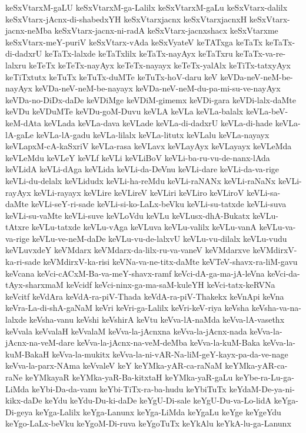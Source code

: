 {keSxVtarxM-gaLU
keSxVtarxM-ga-Lalilx
keSxVtarxM-gaLu
keSxVtarx-dalilx
keSxVtarx-jAcnx-di-shabedxYH
keSxVtarxjacnx
keSxVtarxjacnxH
keSxVtarx-jacnx-neMba
keSxVtarx-jacnx-ni-radA
keSxVtarx-jacnxshacx
keSxVtarxme
keSxVtarx-meY-puriV
keSxVtarx-vAda
keSxVyateV
keTATxga
keTaTx
keTaTx-di-dadxrU
keTaTx-lalxde
keTaTxlilx
keTaTx-nayAyx
keTaTxru
keTaTx-va-re-lalxru
keTeTx
keTeTx-nayAyx
keTeTx-nayayx
keTeTx-yalAlx
keTiTx-tatxyAyx
keTiTxtutx
keTuTx
keTuTx-duMTe
keTuTx-hoV-daru
keV
keVDa-neV-neM-be-nayAyx
keVDa-neV-neM-be-nayayx
keVDa-neV-neM-du-pa-mi-su-ve-nayAyx
keVDa-no-DiDx-daDe
keVDiMge
keVDiM-gimemx
keVDi-gara
keVDi-lalx-daMte
keVDu
keVDuMTe
keVDu-goM-Duvu
keVLA
keVLa
keVLa-balalx
keVLa-beV-keM-dAta
keVLada
keVLa-dava
keVLade
keVLa-di-dadxrU
keVLa-di-hade
keVLa-lA-gaLe
keVLa-lA-gadu
keVLa-lilalx
keVLa-litutx
keVLalu
keVLa-nayayx
keVLapxM-cA-kaSxriV
keVLa-rasa
keVLavx
keVLayAyx
keVLayayx
keVLeMda
keVLeMdu
keVLeY
keVLf
keVLi
keVLiBoV
keVLi-ba-ru-vu-de-nanx-lAda
keVLidA
keVLi-dAga
keVLida
keVLi-da-DeVnu
keVLi-dare
keVLi-da-va-rige
keVLi-du-delalx
keVLidudx
keVLi-ha-reMdu
keVLi-raNANx
keVLi-raNaNx
keVLi-rayAyx
keVLi-rayayx
keVLire
keVLireV
keVLiri
keVLiro
keVLiroV
keVLi-sa-daMte
keVLi-seY-ri-sade
keVLi-si-ko-LaLx-beVku
keVLi-su-tatxde
keVLi-suva
keVLi-su-vaMte
keVLi-suve
keVLoVdu
keVLu
keVLusx-dhA-Bukatx
keVLu-tAtxre
keVLu-tatxde
keVLu-vAga
keVLuva
keVLu-valilx
keVLu-vanA
keVLu-va-va-rige
keVLu-ve-neM-daDe
keVLu-vu-de-lalxvU
keVLu-vu-dilalx
keVLu-vudu
keVLuvxdeY
keVMdarx
keVMdarx-da-lilx-ru-va-vaneV
keVMdarxve
keVMdirxV-ka-ri-sade
keVMdirxV-ka-risi
keVNa-va-ne-titx-daMte
keVTeV-shavx-ra-liM-gavu
keVcana
keVci-cACxM-Ba-va-meY-shavx-ramf
keVci-dA-ga-ma-jA-leVna
keVci-da-tAyx-sharxmaM
keVcidf
keVci-ninx-ga-ma-saM-kuleYH
keVci-tatx-keRVNa
keVcitf
keVdAra
keVdA-ra-piV-Thada
keVdA-ra-piV-Thakekx
keVnApi
keVna
keVra-La-di-shA-gaNaM
keVri
keVri-ga-Lalilx
keVri-keV-riya
keVsha
keVsha-va-na-lalxde
keVsha-vanu
keVshi
keVshirA
keVtu
keVva-lA-naMda
keVva-lA-vasethx
keVvala
keVvalaH
keVvalaM
keVva-la-jAcnxna
keVva-la-jAcnx-nada
keVva-la-jAcnx-na-veM-dare
keVva-la-jAcnx-na-veM-deMba
keVva-la-kuM-Baka
keVva-la-kuM-BakaH
keVva-la-mukitx
keVva-la-ni-vAR-Na-liM-geY-kayx-pa-da-ve-nage
keVva-la-parx-NAma
keVvaleV
keY
keYMka-yAR-ca-raNaM
keYMka-yAR-ca-raNe
keYMkayaR
keYMka-yaR-Ba-kitxtaH
keYMka-yaR-gaLu
keYbe-ra-Lu-ga-LiMda
keYbi-Da-da-vanu
keYbi-TiTx-ra-ba-hudu
keYbiTuTx
keYdaM-De-ya-ni-kikx-daDe
keYdu
keYdu-Du-ki-daDe
keYgU-Di-sale
keYgU-Du-va-Lo-lidA
keYga-Di-geya
keYga-Lalilx
keYga-Lanunx
keYga-LiMda
keYgaLu
keYge
keYgeYdu
keYgo-LaLx-beVku
keYgoM-Di-ruva
keYgoTuTx
keYkAlu
keYkA-lu-ga-Lanunx
}
